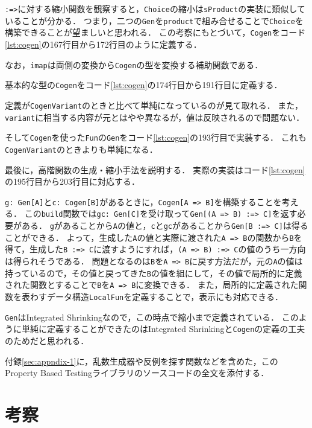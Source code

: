 \documentclass[submit,PRO]{ipsj}
\theoremstyle{definition}
\begin{document}
\texttt{:=>}に対する縮小関数を観察すると，\texttt{Choice}の縮小は\texttt{sProduct}の実装に類似していることが分かる．
つまり，二つの\texttt{Gen}を\texttt{product}で組み合せることで\texttt{Choice}を構築できることが望ましいと思われる．
この考察にもとづいて，\texttt{Cogen}をコード\ref{lst:cogen}の167行目から172行目のように定義する．

なお，\texttt{imap}は両側の変換から\texttt{Cogen}の型を変換する補助関数である．

基本的な型の\texttt{Cogen}をコード\ref{lst:cogen}の174行目から191行目に定義する．

定義が\texttt{CogenVariant}のときと比べて単純になっているのが見て取れる．
また，\texttt{variant}に相当する内容が元とはやや異なるが，値は反映されるので問題ない．

そして\texttt{Cogen}を使った\texttt{Fun}の\texttt{Gen}をコード\ref{lst:cogen}の193行目で実装する．
これも\texttt{CogenVariant}のときよりも単純になる．

最後に，高階関数の生成・縮小手法を説明する．
実際の実装はコード\ref{lst:cogen}の195行目から203行目に対応する．

\texttt{g:\ Gen[A]}と\texttt{c:\ Cogen[B]}があるときに，\texttt{Cogen[A => B]}を構築することを考える．
この\texttt{build}関数では\texttt{gc: Gen[C]}を受け取って\texttt{Gen[(A => B) :=> C]}を返す必要がある．
\texttt{g}があることから\texttt{A}の値と，\texttt{c}と\texttt{gc}があることから\texttt{Gen[B :=> C]}は得ることができる．
よって，生成した\texttt{A}の値と実際に渡された\texttt{A => B}の関数から\texttt{B}を得て，生成した\texttt{B :=> C}に渡すようにすれば，\texttt{(A => B) :=> C}の値のうち一方向は得られそうである．
問題となるのは\texttt{B}を\texttt{A => B}に戻す方法だが，元の\texttt{A}の値は持っているので，その値と戻ってきた\texttt{B}の値を組にして，その値で局所的に定義された関数とすることで\texttt{B}を\texttt{A => B}に変換できる．
また，局所的に定義された関数を表わすデータ構造\texttt{LocalFun}を定義することで，表示にも対応できる．

\texttt{Gen}はIntegrated Shrinkingなので，この時点で縮小まで定義されている．
このように単純に定義することができたのはIntegrated Shrinkingと\texttt{Cogen}の定義の工夫のためだと思われる．

付録\ref{sec:appndix-1}に，乱数生成器や反例を探す関数などを含めた，このProperty Based Testingライブラリのソースコードの全文を添付する．

\section{考察}
\end{document}
